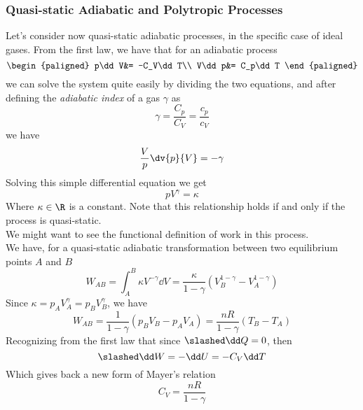 \documentclass[../qm.tex]{subfiles}
\begin{document}
\subsubsection{Quasi-static Adiabatic and Polytropic Processes}
Let's consider now quasi-static adiabatic processes, in the specific case of ideal gases. From the first law, we have that for an adiabatic process
\begin{equation}
	\begin{paligned}
		p\dd V&= -C_V\dd T\\
		V\dd p&= C_p\dd T
	\end{paligned}
	\label{eq:ad1stlaw.ig}
\end{equation}
we can solve the system quite easily by dividing the two equations, and after defining the \emph{adiabatic index} of a gas $\gamma$ as
\begin{equation}
	\gamma=\frac{C_p}{C_V}=\frac{c_p}{c_V}
	\label{eq:adindex.ig}
\end{equation}
we have
\begin{equation}
	\frac{V}{p}\dv{p}{V}=-\gamma
	\label{eq:eqtosolve.ig}
\end{equation}
Solving this simple differential equation we get
\begin{equation}
	pV^\gamma=\kappa
	\label{eq:adiabaticproc.ig}
\end{equation}
Where $\kappa\in\R$ is a constant. Note that this relationship holds if and only if the process is quasi-static.\\
We might want to see the functional definition of work in this process.\\
We have, for a quasi-static adiabatic transformation between two equilibrium points $A$ and $B$
\begin{equation}
	W_{AB}=\int_{A}^B\kappa V^{-\gamma}\dd V=\frac{\kappa}{1-\gamma}\left( V_B^{1-\gamma}-V_A^{1-\gamma} \right)
	\label{eq:workfunc.adig}
\end{equation}
Since $\kappa=p_AV_A^\gamma=p_BV_B^\gamma$, we have
\begin{equation}
	W_{AB}=\frac{1}{1-\gamma}\left( p_BV_B-p_AV_A \right)=\frac{nR}{1-\gamma}\left( T_B-T_A \right)
	\label{eq:workad.ig}
\end{equation}
Recognizing from the first law that since $\slashed\dd Q=0$, then 
\begin{equation*}
	\slashed\dd W=-\dd U=-C_V\dd T
\end{equation*}
Which gives back a new form of Mayer's relation
\begin{equation}
	C_V=\frac{nR}{1-\gamma}
	\label{eq:mayers2.ig}
\end{equation}
\end{document}

